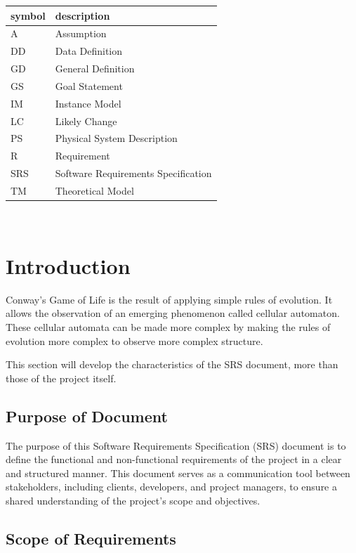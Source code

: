 \documentclass[12pt]{article}
\begin{document}
\renewcommand{\arraystretch}{1.2}
\begin{tabular}{l l} 
  \toprule		
  \textbf{symbol} & \textbf{description}\\
  \midrule 
  A & Assumption\\
  DD & Data Definition\\
  GD & General Definition\\
  GS & Goal Statement\\
  IM & Instance Model\\
  LC & Likely Change\\
  PS & Physical System Description\\
  R & Requirement\\
  SRS & Software Requirements Specification\\
  TM & Theoretical Model\\
  \bottomrule
\end{tabular}\\



\section{Introduction}

Conway's Game of Life is the result of applying simple rules of evolution.
It allows the observation of an emerging phenomenon called cellular automaton.
These cellular automata can be made more complex by making the rules of evolution more complex to observe more complex structure.

This section will develop the characteristics of the SRS document, more than those of the project itself.

\subsection{Purpose of Document}

The purpose of this Software Requirements Specification (SRS) document is to define the functional and non-functional requirements of the 
project in a clear and structured manner. This document serves as a communication tool between stakeholders, including clients, developers, 
and project managers, to ensure a shared understanding of the project's scope and objectives.

\subsection{Scope of Requirements} 
\end{document}
